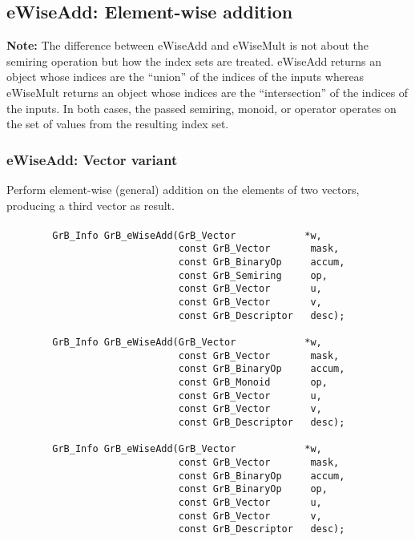 \subsection{{\sf eWiseAdd}: Element-wise addition}

{\bf Note:} The difference between {\sf eWiseAdd} and {\sf eWiseMult} is not 
about the semiring operation but how the index sets are treated.
{\sf eWiseAdd} returns an object whose indices are the ``union'' of the indices 
of the inputs whereas  
{\sf eWiseMult} returns an object whose indices are the ``intersection'' of the 
indices of the inputs. In both cases, the passed semiring, monoid, or operator 
operates on the set of values from the resulting index set. 


\subsubsection{{\sf eWiseAdd}: Vector variant}

Perform element-wise (general) addition on the elements of two vectors,
producing a third vector as result.

\paragraph{\syntax}

\begin{verbatim}
        GrB_Info GrB_eWiseAdd(GrB_Vector            *w,
                              const GrB_Vector       mask,
                              const GrB_BinaryOp     accum,
                              const GrB_Semiring     op, 
                              const GrB_Vector       u,
                              const GrB_Vector       v,
                              const GrB_Descriptor   desc);
                            
        GrB_Info GrB_eWiseAdd(GrB_Vector            *w,
                              const GrB_Vector       mask,
                              const GrB_BinaryOp     accum,
                              const GrB_Monoid       op, 
                              const GrB_Vector       u,
                              const GrB_Vector       v,
                              const GrB_Descriptor   desc);

        GrB_Info GrB_eWiseAdd(GrB_Vector            *w,
                              const GrB_Vector       mask,
                              const GrB_BinaryOp     accum,
                              const GrB_BinaryOp     op, 
                              const GrB_Vector       u,
                              const GrB_Vector       v,
                              const GrB_Descriptor   desc);
\end{verbatim}

